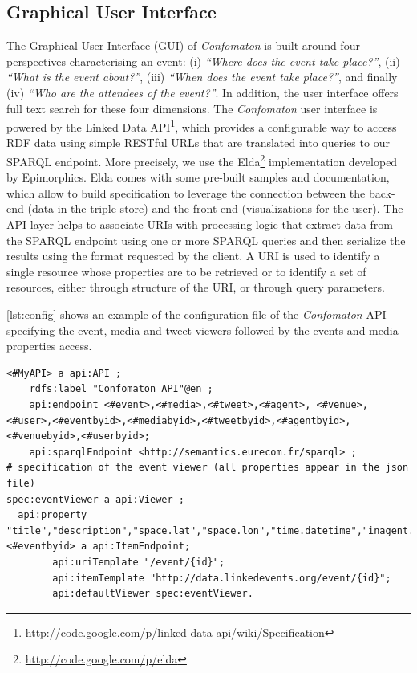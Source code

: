 \subsection{Graphical User Interface}
The Graphical User Interface (GUI) of \emph{Confomaton} is built around four perspectives characterising an event: (i) \textit{``Where does the event take place?''}, (ii) \textit{``What is the event about?''}, (iii) \textit{``When does the event take place?''}, and finally (iv) \textit{``Who are the attendees of the event?''}. In addition, the user interface offers full text search for these four dimensions. The \emph{Confomaton} user interface is powered by the Linked Data API\footnote{\url{http://code.google.com/p/linked-data-api/wiki/Specification}}, which provides a configurable way to access RDF data using simple RESTful URLs that are translated into queries to our SPARQL endpoint. More precisely, we use the Elda\footnote{\url{http://code.google.com/p/elda}} implementation developed by Epimorphics. Elda comes with some pre-built samples and documentation, which allow to build specification to leverage the connection between the back-end (data in the triple store) and the front-end (visualizations for the user). The API layer helps to associate URIs with processing logic that extract data from the SPARQL endpoint using one or more SPARQL queries and then serialize the results using the format requested by the client. A URI is used to identify a single resource whose properties are to be retrieved or to identify a set of resources, either through structure of the URI, or through query parameters.

\autoref{lst:config} shows an example of the configuration file of the \emph{Confomaton} API specifying the event, media and tweet viewers followed by the events and media properties access.
\begin{lstlisting}[caption={Example configuration file of the \emph{Confomaton} API, specifying event properties access.},label={lst:config}]
<#MyAPI> a api:API ;
	rdfs:label "Confomaton API"@en ;
	api:endpoint <#event>,<#media>,<#tweet>,<#agent>, <#venue>,<#user>,<#eventbyid>,<#mediabyid>,<#tweetbyid>,<#agentbyid>,<#venuebyid>,<#userbyid>;
	api:sparqlEndpoint <http://semantics.eurecom.fr/sparql> ;
# specification of the event viewer (all properties appear in the json file)
spec:eventViewer a api:Viewer ;
  api:property "title","description","space.lat","space.lon","time.datetime","inagent.label",...
<#eventbyid> a api:ItemEndpoint;
		api:uriTemplate "/event/{id}";
		api:itemTemplate "http://data.linkedevents.org/event/{id}";
		api:defaultViewer spec:eventViewer.		
\end{lstlisting}

